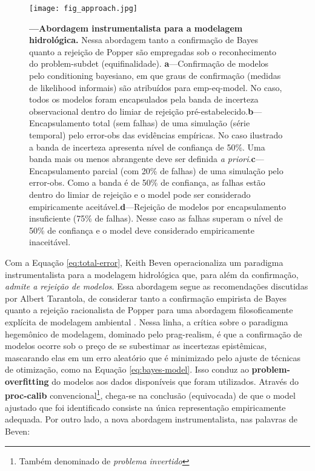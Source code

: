 \documentclass[./main.tex]{subfiles}
\begin{document}
\begin{figure}[t!] %
	\centering				
	\texttt{[image: fig\_approach.jpg]}		
	\caption[Abordagem instrumentalista para a modelagem hidrológica]
	{\textbf{---\;Abordagem instrumentalista para a modelagem hidrológica.}
        Nessa abordagem tanto a confirmação de Bayes quanto a rejeição de Popper são empregadas sob o reconhecimento do \gls{problem-subdet} (equifinalidade). \;\textbf{a}\;---\;Confirmação de modelos pelo \gls{conditioning} bayesiano, em que graus de confirmação (medidas de \gls{likelihood} informais) são atribuídos para \gls{emp-eq-model}. No caso, todos os modelos foram encapsulados pela banda de incerteza observacional dentro do limiar de rejeição pré-estabelecido.\;\textbf{b}\;---\;Encapsulamento total (sem falhas) de uma simulação (série temporal) pelo \gls{error-obs} das evidências empíricas. No caso ilustrado a banda de incerteza apresenta nível de confiança de 50\%. Uma banda mais ou menos abrangente deve ser definida \textit{a priori}.\;\textbf{c}\;---\;Encapsulamento parcial (com 20\% de falhas) de uma simulação pelo \gls{error-obs}. Como a banda é de 50\% de confiança, as falhas estão dentro do limiar de rejeição e o \gls{model} pode ser considerado empiricamente aceitável.\;\textbf{d}\;---\;Rejeição de modelos por encapsulamento insuficiente (75\% de falhas). Nesse caso as falhas superam o nível de 50\% de confiança e o \gls{model} deve considerado empiricamente inaceitável.\;
	}
\label{fig:approach}  %
\end{figure}

\par Com a Equação \eqref{eq:total-error}, Keith Beven operacionaliza um \gls{paradigma} instrumentalista para a modelagem hidrológica que, para além da confirmação, \textit{admite a rejeição de modelos}. Essa abordagem segue as recomendações discutidas por Albert Tarantola, de considerar tanto a confirmação empirista de Bayes quanto a rejeição racionalista de Popper para uma abordagem filosoficamente explícita de modelagem ambiental \cite{Tarantola2006}. Nessa linha, a crítica sobre o \gls{paradigma} hegemônico de modelagem, dominado pelo \gls{prag-realism}, é que a confirmação de modelos ocorre sob o preço de se subestimar as incertezas epistêmicas, mascarando elas em um erro aleatório que é minimizado pelo ajuste de técnicas de otimização, como na Equação \eqref{eq:bayes-model}. Isso conduz ao \textbf{\gls{problem-overfitting}} do modelos aos dados disponíveis que foram utilizados. Através do \textbf{\gls{proc-calib}} convencional\footnote{Também denominado de \textit{problema invertido}}, chega-se na conclusão (equivocada) de que o \gls{model} ajustado que foi identificado consiste na única representação empiricamente adequada. Por outro lado, a nova abordagem instrumentalista, nas palavras de Beven:
\end{document}
